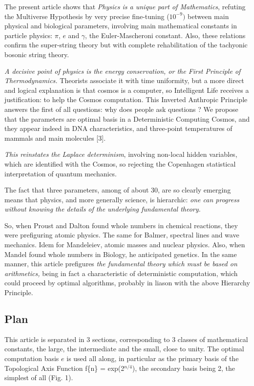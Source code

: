 \documentclass[twoside,draft]{article}
\begin{document}
\begin{sloppypar}
{The present article shows that \textit{Physics is a unique part of Mathematics}, refuting the Multiverse Hypothesis by very precise fine-tuning ($10^{-9})$ between main physical and biological parameters, involving main mathematical constants in particle physics: $\pi$, $e$ and $\gamma$, the Euler-Mascheroni constant. Also, these relations confirm the super-string theory but with complete rehabilitation of the tachyonic bosonic string theory.

\textit{A decisive point of physics is the energy conservation, or the First Principle of Thermodynamics.} Theorists associate it with time uniformity, but a more direct and logical explanation is that cosmos is a computer, so Intelligent Life receives a justification: to help the Cosmos computation. This Inverted Anthropic Principle answers the first of all questions: why does people ask questions ? We propose that the parameters are optimal basis in a Deterministic Computing Cosmos, and they appear indeed in DNA characteristics, and three-point temperatures of mammals and main molecules [3].

\textit{This reinstates the Laplace determinism}, involving non-local hidden variables, which are identified with the Cosmos, so rejecting the Copenhagen statistical interpretation of quantum mechanics.

The fact that three parameters, among of about 30, are so clearly emerging means that physics, and more generally science, is hierarchic: \textit{one can progress without knowing the details of the underlying fundamental theory.}

So, when Proust and Dalton found whole numbers in chemical reactions, they were prefiguring atomic physics. The same for Balmer, spectral lines and wave mechanics. Idem for Mandeleiev, atomic masses and nuclear physics. Also, when Mandel found whole numbers in Biology, he anticipated genetics. In the same manner, this article prefigures \textit{the fundamental theory which must be based on arithmetics,} being in fact a characteristic of deterministic computation, which could proceed by optimal algorithms, probably in liason with the above Hierarchy Principle.

\subsection{Plan}
This article is separated in 3 sections, corresponding to 3 classes of mathematical constants, the large, the intermediate and the small, close to unity. The optimal computation basis $e$ is used all along, in particular as the primary basis of the Topological Axis Function f\{n\} = exp(2$^{n/4}$), the secondary basis being 2, the simplest of all (Fig. 1).

}
\end{sloppypar}
\end{document}
